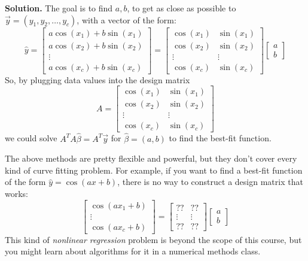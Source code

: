 \documentclass[11pt, letterpaper]{report}
\newenvironment{notes}{}{}
\newenvironment{book}{}{}
\newcounter{example}[section]
\newcommand{\bbvec}[2]{
  \begin{bmatrix} #1 \\ #2 \end{bmatrix}
}
\newcommand{\bbbvec}[3]{
  \begin{bmatrix} #1 \\ #2 \\ #3 \end{bmatrix}
}
\begin{document}
\begin{notes}
\vspace{8em}
\end{notes}

\begin{book}
\textbf{Solution.} The goal is to find $a,b$, to get as close as possible to $\vec{y}=(y_1,y_2,\ldots,y_c)$, with a vector of the form:
\[\hat{y}=\begin{bmatrix}
a\cos(x_1)+b\sin(x_1) \\
a\cos(x_2)+b\sin(x_2) \\
\vdots\\
a\cos(x_c)+b\sin(x_c) 
\end{bmatrix} = 
\begin{bmatrix}
\cos(x_1) & \sin(x_1) \\
\cos(x_2) & \sin(x_2) \\
\vdots & \vdots \\
\cos(x_c) & \sin(x_c)
\end{bmatrix}\bbvec{a}{b}\]
So, by plugging data values into the design matrix
\[A=\begin{bmatrix}
\cos(x_1) & \sin(x_1) \\
\cos(x_2) & \sin(x_2) \\
\vdots & \vdots \\
\cos(x_c) & \sin(x_c)
\end{bmatrix}\]
we could solve $A^TA\hat{\beta}=A^T\vec{y}$ for $\hat{\beta}=(a,b)$ to find the best-fit function. \blacksquare
\end{book}



The above methods are pretty flexible and powerful, but they don't cover every kind of curve fitting problem. For example, if you want to find a best-fit function of the form $\hat{y}=\cos(ax+b)$, there is no way to construct a design matrix that works:
\[\bbbvec{\cos(ax_1+b)}{\vdots}{\cos(ax_c+b)} = \begin{bmatrix}
?? & ?? \\
\vdots & \vdots \\
?? & ??
\end{bmatrix}\bbvec{a}{b}\]
This kind of \emph{nonlinear regression} problem is beyond the scope of this course, but you might learn about algorithms for it in a numerical methods class. 
\end{document}
